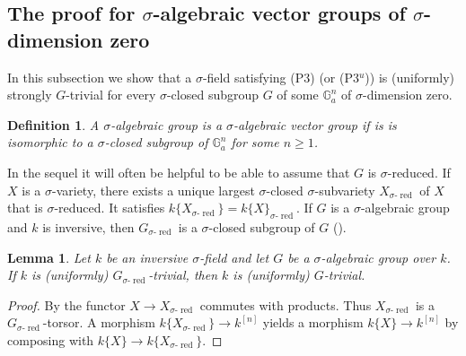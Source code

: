 \documentclass[oneside,reqno]{amsart}
\newtheorem{lemma}[theo]{Lemma}
\newtheorem{defi}[theo]{Definition}
\theoremstyle{definition}
\newcommand{\s}{\sigma}
\newcommand{\Gm}{\mathbb{G}_m}
\newcommand{\Ga}{\mathbb{G}_a}
\newcommand{\kn}{k^{[n]}}
\newcommand{\sred}{{\sigma\text{-}\operatorname{red}}}
\newcommand{\pt}{{\rm{(P3$^u$)}}}
\newcommand{\ptweak}{{\rm{(P3)}}}
\newcommand{\mw}[1]{\todo[inline,color=green!20!white]{\textbf{Michael:} #1}}
\begin{document}
\subsection{The proof for $\s$-algebraic vector groups of $\s$-dimension zero}
	
	\label{subsection: abelian}

In this subsection we show that a $\s$-field satisfying \ptweak{} (or \pt{}) is (uniformly) strongly $G$-trivial for every $\s$-closed subgroup $G$ of some $\Ga^n$ of $\s$-dimension zero.



\begin{defi}
A $\s$-algebraic group is a \emph{$\s$-algebraic vector group} if is is isomorphic to a $\s$-closed subgroup of $\Ga^n$ for some $n\geq 1$. 	
\end{defi}




In the sequel it will often be helpful to be able to assume that $G$ is $\s$-reduced. If $X$ is a $\s$-variety, there exists a unique largest $\s$-closed $\s$-subvariety $X_\sred$ of $X$ that is $\s$-reduced. It satisfies $k\{X_{\sred}\}=k\{X\}_{\sred}$. If $G$ is a $\s$-algebraic group and $k$ is inversive, then $G_\sred$ is a $\s$-closed subgroup of $G$ (\cite[Cor. 2.9]{Wibmer:almostsimple}). 


\begin{lemma} \label{lemma: reduce to sreduced}
	Let $k$ be an inversive $\s$-field and let $G$ be a $\s$-algebraic group over $k$. If $k$ is (uniformly) $G_\sred$-trivial, then $k$ is (uniformly) $G$-trivial.
\end{lemma}
\begin{proof}
	By \cite[Cor. 2.8 (ii)]{Wibmer:almostsimple} the functor $X\to X_\sred$ commutes with products. Thus $X_\sred$ is a $G_\sred$-torsor. A morphism $k\{X_\sred\}\to\kn$ yields a morphism $k\{X\}\to \kn$ by composing with $k\{X\}\to k\{X_\sred\}$.
\end{proof}
\end{document}
